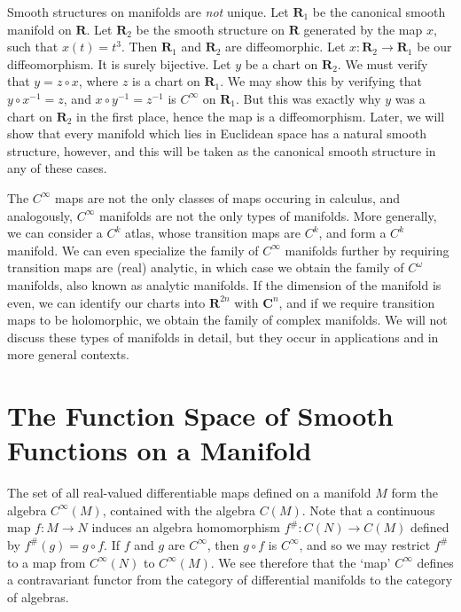 \begin{example}
    Smooth structures on manifolds are {\it not} unique. Let $\mathbf{R}_1$ be the canonical smooth manifold on $\mathbf{R}$. Let $\mathbf{R}_2$ be the smooth structure on $\mathbf{R}$ generated by the map $x$, such that $x(t) = t^3$. Then $\mathbf{R}_1$ and $\mathbf{R}_2$ are diffeomorphic. Let $x:\mathbf{R}_2 \to \mathbf{R}_1$ be our diffeomorphism. It is surely bijective. Let $y$ be a chart on $\mathbf{R}_2$. We must verify that $y = z \circ x$, where $z$ is a chart on $\mathbf{R}_1$. We may show this by verifying that $y \circ x^{-1} = z$, and $x \circ y^{-1} = z^{-1}$ is $C^\infty$ on $\mathbf{R}_1$. But this was exactly why $y$ was a chart on $\mathbf{R}_2$ in the first place, hence the map is a diffeomorphism. Later, we will show that every manifold which lies in Euclidean space has a natural smooth structure, however, and this will be taken as the canonical smooth structure in any of these cases.
\end{example}

The $C^\infty$ maps are not the only classes of maps occuring in calculus, and analogously, $C^\infty$ manifolds are not the only types of manifolds. More generally, we can consider a $C^k$ atlas, whose transition maps are $C^k$, and form a $C^k$ manifold. We can even specialize the family of $C^\infty$ manifolds further by requiring transition maps are (real) analytic, in which case we obtain the family of $C^\omega$ manifolds, also known as analytic manifolds. If the dimension of the manifold is even, we can identify our charts into $\mathbf{R}^{2n}$ with $\mathbf{C}^n$, and if we require transition maps to be holomorphic, we obtain the family of complex manifolds. We will not discuss these types of manifolds in detail, but they occur in applications and in more general contexts.

\section{The Function Space of Smooth Functions on a Manifold}

The set of all real-valued differentiable maps defined on a manifold $M$ form the algebra $C^\infty(M)$, contained with the algebra $C(M)$. Note that a continuous map $f: M \to N$ induces an algebra homomorphism $f^\#: C(N) \to C(M)$ defined by $f^\#(g) = g \circ f$. If $f$ and $g$ are $C^\infty$, then $g \circ f$ is $C^\infty$, and so we may restrict $f^\#$ to a map from $C^\infty(N)$ to $C^\infty(M)$. We see therefore that the `map' $C^\infty$ defines a contravariant functor from the category of differential manifolds to the category of algebras.

